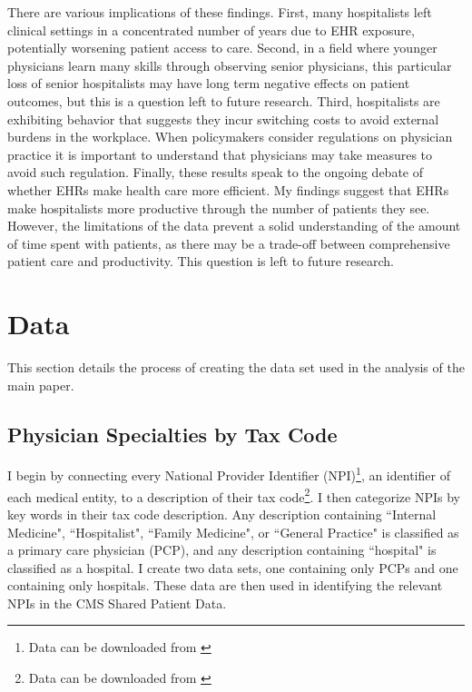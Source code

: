 \documentclass[12pt]{article}
\begin{document}
There are various implications of these findings. First, many hospitalists left clinical settings in a concentrated number of years due to EHR exposure, potentially worsening patient access to care. Second, in a field where younger physicians learn many skills through observing senior physicians, this particular loss of senior hospitalists may have long term negative effects on patient outcomes, but this is a question left to future research. Third, hospitalists are exhibiting behavior that suggests they incur switching costs to avoid external burdens in the workplace. When policymakers consider regulations on physician practice it is important to understand that physicians may take measures to avoid such regulation. Finally, these results speak to the ongoing debate of whether EHRs make health care more efficient. My findings suggest that EHRs make hospitalists more productive through the number of patients they see. However, the limitations of the data prevent a solid understanding of the amount of time spent with patients, as there may be a trade-off between comprehensive patient care and productivity. This question is left to future research.  
 




\clearpage
\onehalfspacing

\printbibliography

\clearpage


\appendix

\section{Data}\label{app:data}

This section details the process of creating the data set used in the analysis of the main paper. 

\subsection{Physician Specialties by Tax Code}\label{sec:taxcode}

I begin by connecting every National Provider Identifier (NPI)\footnote{Data can be downloaded from \hyperlink{https://download.cms.gov/nppes/NPI/Files.html}{}}, an identifier of each medical entity, to a description of their tax code\footnote{Data can be downloaded from \hyperlink{https://nucc.org/index.php/code-sets-mainmenu-41/provider-taxonomy-mainmenu-40/pdf-mainmenu-53}{}}. I then categorize NPIs by key words in their tax code description. Any description containing ``Internal Medicine", ``Hospitalist", ``Family Medicine", or ``General Practice" is classified as a primary care physician (PCP), and any description containing ``hospital" is classified as a hospital. I create two data sets, one containing only PCPs and one containing only hospitals. These data are then used in identifying the relevant NPIs in the CMS Shared Patient Data. 
\end{document}
